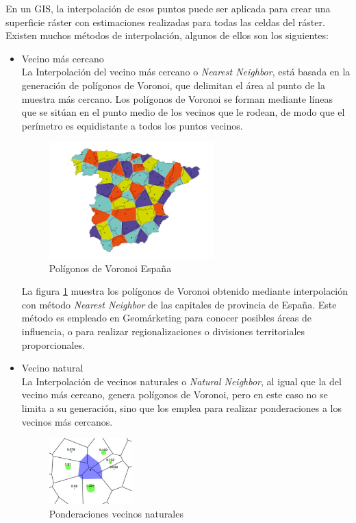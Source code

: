 En un GIS, la interpolación de esos puntos puede ser aplicada para crear una superficie ráster con estimaciones realizadas para todas las celdas del ráster.
Existen muchos métodos de interpolación, algunos de ellos son los siguientes:

\begin{itemize}
    \item Vecino más cercano \\
    La Interpolación del vecino más cercano o \textit{Nearest Neighbor}, está basada en la generación de polígonos de Voronoi, que delimitan el área al punto de la muestra más cercano.
    Los polígonos de Voronoi se forman mediante líneas que se sitúan en el punto medio de los vecinos que le rodean, de modo que el perímetro es equidistante a todos los puntos vecinos.
    \begin{figure}[H]
        \centering
        \includegraphics[width=0.60\textwidth]{Imagenes/analisis/voronoi.jpg}
        \caption{Polígonos de Voronoi España} \label{fig:voronoi}
    \end{figure}

    La figura \ref{fig:voronoi} muestra los polígonos de Voronoi obtenido mediante interpolación con método \textit{Nearest Neighbor} de las capitales de provincia de España.
    Este método es empleado en Geomárketing para conocer posibles áreas de influencia, o para realizar regionalizaciones o divisiones territoriales proporcionales.

    \item Vecino natural \\
    La Interpolación de vecinos naturales o \textit{Natural Neighbor}, al igual que la del vecino más cercano, genera polígonos de Voronoi, pero en este caso no se limita a su generación,
    sino que los emplea para realizar ponderaciones a los vecinos más cercanos. 
    
    \begin{figure}[H]
        \centering
        \includegraphics[width=0.30\textwidth]{Imagenes/analisis/vecino-natural.png}
        \caption{Ponderaciones vecinos naturales} \label{fig:vecino-natural}
    \end{figure}


\end{itemize}
